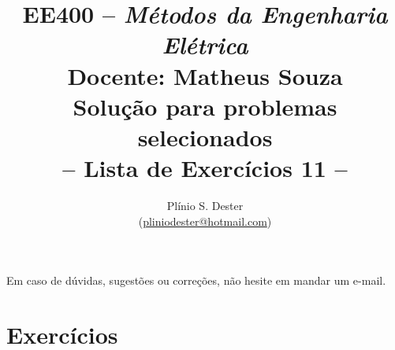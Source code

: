 \documentclass[answers, 12pt]{exam}
\title{	%
        EE400 -- \textit{Métodos da Engenharia Elétrica} \\[-0mm]
        {\Large Docente: Matheus Souza} \\[+1mm]
        {\Large Solução para problemas selecionados}\\[-0mm]
        -- Lista de Exercícios 11 --
}
\author{Plínio S. Dester\\ (\url{pliniodester@hotmail.com})}
\begin{document}
\maketitle

Em caso de dúvidas, sugestões ou correções, não hesite em mandar um e-mail.


\setcounter{section}{10}
\section{Exercícios}


% 

% 
\end{document}
